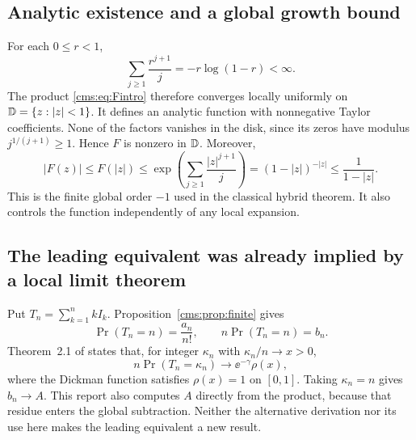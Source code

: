 \subsection{Analytic existence and a global growth bound}
For each $0\leq r<1$,
\[
\sum_{j\geq1}\frac{r^{j+1}}j=-r\log(1-r)<\infty.
\]
The product \eqref{cms:eq:Fintro} therefore converges locally uniformly on $\mathbb D=\{z:|z|<1\}$. It defines an analytic function with nonnegative Taylor coefficients. None of the factors vanishes in the disk, since its zeros have modulus $j^{1/(j+1)}\geq1$. Hence $F$ is nonzero in $\mathbb D$. Moreover,
\begin{equation}\label{cms:eq:globalbound}
|F(z)|\leq F(|z|)
\leq\exp\!\left(\sum_{j\geq1}\frac{|z|^{j+1}}j\right)
=(1-|z|)^{-|z|}\leq\frac1{1-|z|}.
\end{equation}
This is the finite global order $-1$ used in the classical hybrid theorem. It also controls the function independently of any local expansion.

\subsection{The leading equivalent was already implied by a local limit theorem}
Put $T_n=\sum_{k=1}^{n}kI_k$. Proposition~\ref{cms:prop:finite} gives
\[
\Pr(T_n=n)=\frac{a_n}{n!},\qquad n\Pr(T_n=n)=b_n.
\]
Theorem~2.1 of \cite{GSW} states that, for integer $\kappa_n$ with $\kappa_n/n\to x>0$,
\[
n\Pr(T_n=\kappa_n)\longrightarrow\ee^{-\gamma}\rho(x),
\]
where the Dickman function satisfies $\rho(x)=1$ on $[0,1]$. Taking $\kappa_n=n$ gives $b_n\to A$. This report also computes $A$ directly from the product, because that residue enters the global subtraction. Neither the alternative derivation nor its use here makes the leading equivalent a new result.
